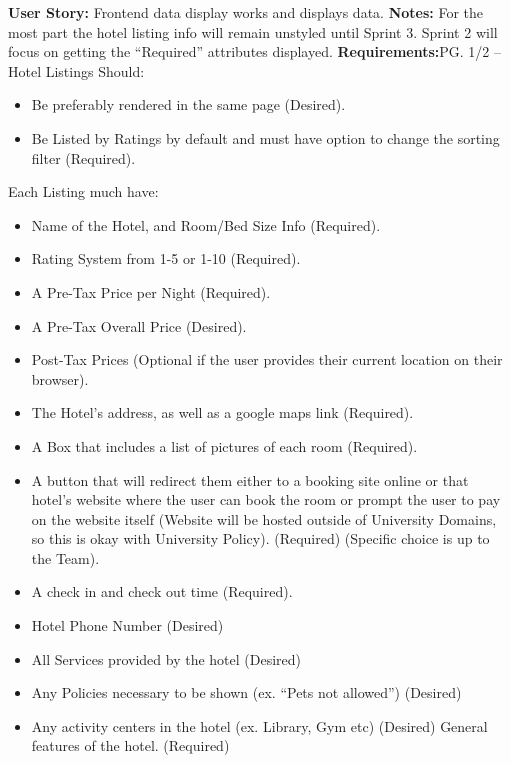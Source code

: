 \documentclass[]{article}
\begin{document}
\noindent
\textbf{User Story:} Frontend data display works and displays data. \newline
\textbf{Notes:} For the most part the hotel listing info will remain unstyled until Sprint 3. Sprint 2 will focus on getting the “Required” attributes displayed. \newline
\textbf{Requirements:}\newline PG. 1/2 – Hotel Listings Should:
\begin{itemize}
    \item Be preferably rendered in the same page (Desired).
    \item Be Listed by Ratings by default and must have option to change the sorting filter (Required).
\end{itemize}
\noindent
Each Listing much have:
\begin{itemize}
    \item Name of the Hotel, and Room/Bed Size Info (Required).
    \item Rating System from 1-5 or 1-10 (Required).
    \item A Pre-Tax Price per Night (Required).
    \item A Pre-Tax Overall Price (Desired).
    \item Post-Tax Prices (Optional if the user provides their current location on their browser).
    \item The Hotel’s address, as well as a google maps link (Required).
    \item A Box that includes a list of pictures of each room (Required).
    \item A button that will redirect them either to a booking site online or that hotel’s website where the user can book the room or prompt the user to pay on the website itself (Website will be hosted outside of University Domains, so this is okay with University Policy). (Required) (Specific choice is up to the Team).
    \item A check in and check out time (Required).
    \item Hotel Phone Number (Desired)
    \item All Services provided by the hotel (Desired)
    \item Any Policies necessary to be shown (ex. “Pets not allowed”) (Desired)
    \item Any activity centers in the hotel (ex. Library, Gym etc) (Desired) General features of the hotel. (Required)
\end{itemize}
\end{document}
